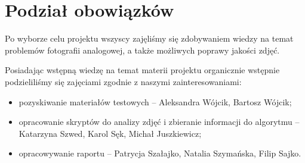 \documentclass[]{mwart}
\begin{document}
\section{Podział obowiązków}
Po wyborze celu projektu wszyscy zajęliśmy się zdobywaniem wiedzy na
temat problemów fotografii analogowej, a także możliwych poprawy jakości zdjęć.\newline


Posiadając wstępną wiedzę na temat materii projektu organicznie wstępnie
podzieliliśmy się zajęciami zgodnie z naszymi zainteresowaniami: \newline
\begin{itemize}
    \item pozyskiwanie materiałów testowych -- Aleksandra Wójcik, Bartosz Wójcik;
    \item opracowanie skryptów do analizy zdjęć i zbieranie informacji do algorytmu -- Katarzyna Szwed, Karol Sęk, Michał Juszkiewicz;
    \item opracowywanie raportu -- Patrycja Szałajko, Natalia Szymańska, Filip Sajko.
\end{itemize}

\newpage
\end{document}
